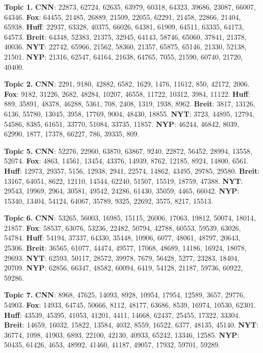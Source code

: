 \documentclass[11pt]{article}
\begin{document}
\textbf{Topic 1.} 
\textbf{CNN}: 22873, 62724, 62635, 63979, 60318, 64323, 39686, 23087, 66007, 64346. 
\textbf{Fox}: 64455, 21485, 26889, 21509, 22055, 62291, 21458, 22866, 21404, 65938. 
\textbf{Huff}: 22937, 63328, 40375, 66026, 64381, 61909, 64511, 63335, 64173, 64573. 
\textbf{Breit}: 64348, 52383, 21375, 32945, 64143, 58746, 65060, 37841, 21378, 40036. 
\textbf{NYT}: 22742, 65966, 21562, 58360, 21357, 65875, 65146, 21330, 52138, 21501.
\textbf{NYP}: 21316, 62547, 64164, 21638, 64765, 7055, 21590, 60740, 21720, 40400.


\textbf{Topic 2.} 
\textbf{CNN}: 2291, 9180, 42882, 6582, 1629, 1476, 11612, 850, 42172, 2006.
\textbf{Fox}: 9182, 31226, 2682, 48284, 10207, 46558, 11722, 10312, 3984, 11122.
\textbf{Huff}: 889, 35891, 48378, 46288, 5361, 708, 2408, 1319, 1938, 8962.
\textbf{Breit}: 3817, 13126, 6136, 55780, 13045, 3958, 17769, 9004, 48430, 18855.
\textbf{NYT}: 3723, 44895, 12794, 54586, 8385, 61651, 33770, 51084, 33735, 11857.
\textbf{NYP}: 46244, 46842, 8039, 62990, 1877, 17378, 66227, 786, 39335, 809.


\textbf{Topic 5.}
\textbf{CNN}: 52276, 22960, 63870, 63867, 9240, 22872, 56452, 28994, 13558, 52074.
\textbf{Fox}: 4863, 14561, 13454, 43376, 14939, 8762, 12185, 8924, 14800, 6561.
\textbf{Huff}: 12973, 29357, 5156, 12938, 2941, 22574, 14862, 43495, 29785, 29580.
\textbf{Breit}: 13167, 64051, 8622, 12110, 14544, 62240, 51507, 15519, 18759, 47388.
\textbf{NYT}: 29543, 19969, 2964, 30581, 49542, 24286, 61430, 35059, 4465, 66042.
\textbf{NYP}: 15340, 13404, 54124, 64067, 35789, 9325, 22692, 3575, 8217, 15513.

\textbf{Topic 6.}
\textbf{CNN}: 53265, 56003, 16985, 15115, 26006, 17063, 19812, 50074, 18014, 21857.
\textbf{Fox}: 58537, 63076, 53236, 22482, 50794, 42788, 60553, 59539, 63026, 54784.
\textbf{Huff}: 54194, 37337, 64330, 35448, 10906, 6077, 48061, 48797, 20643, 25306.
\textbf{Breit}: 36565, 61077, 44474, 49577, 17068, 48689, 14186, 16924, 18078, 29693.
\textbf{NYT}: 62593, 50117, 28572, 39978, 7679, 56428, 5277, 23283, 18404, 20709.
\textbf{NYP}: 62856, 66347, 48582, 60094, 6419, 54128, 21187, 59736, 60922, 59286.

\textbf{Topic 7.}
\textbf{CNN}: 8968, 47625, 14093, 8928, 10954, 17954, 12589, 3657, 29776, 54903.
\textbf{Fox}: 14933, 64745, 50666, 8112, 48177, 63686, 8539, 16974, 10530, 62301.
\textbf{Huff}: 43539, 45395, 41053, 41201, 4411, 14668, 62437, 25455, 17322, 33304.
\textbf{Breit}: 14659, 16032, 15822, 13584, 4032, 8559, 16522, 6377, 48135, 45140.
\textbf{NYT}: 36774, 1098, 41903, 6893, 22100, 42130, 40933, 65242, 13346, 12585.
\textbf{NYP}: 50435, 61426, 4653, 48992, 41460, 41187, 49057, 17932, 59701, 59289.
\end{document}
